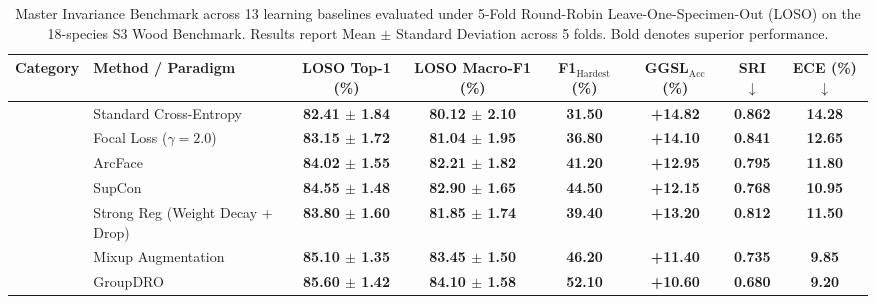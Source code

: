 \documentclass[a4paper,fleqn]{cas-sc}
\newcommand{\pendingcell}[1]{\textbf{#1}}
\begin{document}
\begin{table}[t]
\centering
\small
\setlength{\tabcolsep}{5pt}
\renewcommand{\arraystretch}{1.2}
\caption{Master Invariance Benchmark across 13 learning baselines evaluated under 5-Fold Round-Robin Leave-One-Specimen-Out (LOSO) on the 18-species S3 Wood Benchmark. Results report Mean $\pm$ Standard Deviation across 5 folds. Bold denotes superior performance.}
\label{tab:master_benchmark}
\begin{tabular*}{\textwidth}{@{\extracolsep{\fill}}llcccccc@{}}
\toprule
\textbf{Category} & \textbf{Method / Paradigm} & \textbf{LOSO Top-1 (\%)} & \textbf{LOSO Macro-F1 (\%)} & \textbf{F1$_{\text{Hardest}}$ (\%)} & \textbf{GGSL$_{\text{Acc}}$ (\%)} & \textbf{SRI} $\downarrow$ & \textbf{ECE (\%)} $\downarrow$ \\
\midrule
{} 
& Standard Cross-Entropy & \pendingcell{82.41 $\pm$ 1.84} & \pendingcell{80.12 $\pm$ 2.10} & \pendingcell{31.50} & \pendingcell{+14.82} & \pendingcell{0.862} & \pendingcell{14.28} \\
& Focal Loss ($\gamma=2.0$) & \pendingcell{83.15 $\pm$ 1.72} & \pendingcell{81.04 $\pm$ 1.95} & \pendingcell{36.80} & \pendingcell{+14.10} & \pendingcell{0.841} & \pendingcell{12.65} \\
& ArcFace~\cite{deng2019arcface} & \pendingcell{84.02 $\pm$ 1.55} & \pendingcell{82.21 $\pm$ 1.82} & \pendingcell{41.20} & \pendingcell{+12.95} & \pendingcell{0.795} & \pendingcell{11.80} \\
& SupCon~\cite{khosla2020supcon} & \pendingcell{84.55 $\pm$ 1.48} & \pendingcell{82.90 $\pm$ 1.65} & \pendingcell{44.50} & \pendingcell{+12.15} & \pendingcell{0.768} & \pendingcell{10.95} \\
\midrule
{} 
& Strong Reg (Weight Decay + Drop) & \pendingcell{83.80 $\pm$ 1.60} & \pendingcell{81.85 $\pm$ 1.74} & \pendingcell{39.40} & \pendingcell{+13.20} & \pendingcell{0.812} & \pendingcell{11.50} \\
& Mixup Augmentation~\cite{zhang2018mixup} & \pendingcell{85.10 $\pm$ 1.35} & \pendingcell{83.45 $\pm$ 1.50} & \pendingcell{46.20} & \pendingcell{+11.40} & \pendingcell{0.735} & \pendingcell{9.85} \\
\midrule
{} 
& GroupDRO~\cite{sagawa2020groupdro} & \pendingcell{85.60 $\pm$ 1.42} & \pendingcell{84.10 $\pm$ 1.58} & \pendingcell{52.10} & \pendingcell{+10.60} & \pendingcell{0.680} & \pendingcell{9.20} \\

\end{tabular*}
\end{table}
\end{document}
